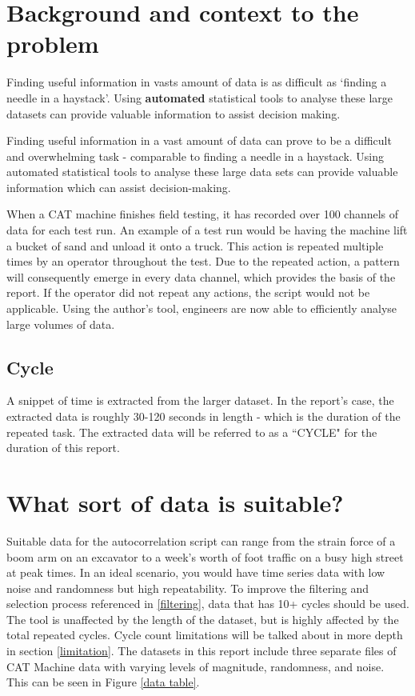 \raggedright
\section{Background and context to the problem}
Finding useful information in vasts amount of data is as difficult as `finding a needle in a haystack'. Using \textbf{automated} statistical tools to analyse these large datasets can provide valuable information to assist decision making.

Finding useful information in a vast amount of data can prove to be a difficult and overwhelming task - comparable to finding a needle in a haystack. Using automated statistical tools to analyse these large data sets can provide valuable information which can assist decision-making. 

When a CAT machine finishes field testing, it has recorded over 100 channels of data for each test run. An example of a test run would be having the machine lift a bucket of sand and unload it onto a truck. This action is repeated multiple times by an operator throughout the test. Due to the repeated action, a pattern will consequently emerge in every data channel, which provides the basis of the report. If the operator did not repeat any actions, the script would not be applicable. Using the author's tool, engineers are now able to efficiently analyse large volumes of data. 


\subsection{Cycle}
A snippet of time is extracted from the larger dataset. In the report's case, the extracted data is roughly 30-120 seconds in length - which is the duration of the repeated task. The extracted data will be referred to as a ``CYCLE" for the duration of this report. 

\section{What sort of data is suitable?}
Suitable data for the autocorrelation script can range from the strain force of a boom arm on an excavator to a week's worth of foot traffic on a busy high street at peak times.  In an ideal scenario, you would have time series data with low noise and randomness but high repeatability. To improve the filtering and selection process referenced in \ref{filtering}, data that has 10+ cycles should be used. The tool is unaffected by the length of the dataset, but is highly affected by the total repeated cycles. Cycle count limitations will be talked about in more depth in section \ref{limitation}. The datasets in this report include three separate files of CAT Machine data with varying levels of magnitude, randomness, and noise. This can be seen in Figure \ref{data table}. 

